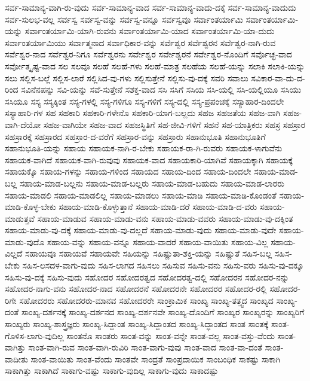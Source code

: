 {ಸರ್ವ-ಸಾಮಾನ್ಯ-ವಾಗಿ-ರು-ವುದು
ಸರ್ವ-ಸಾಮಾನ್ಯ-ವಾದ
ಸರ್ವ-ಸಾಮಾನ್ಯ-ವಾದು-ದಕ್ಕೆ
ಸರ್ವ-ಸಾಮಾನ್ಯ-ವಾದುದು
ಸರ್ವ-ಸುಲಭ-ವಲ್ಲ
ಸರ್ವಸ್ವ
ಸರ್ವಸ್ವ-ವನ್ನು
ಸರ್ವಸ್ವ-ವನ್ನೂ
ಸರ್ವಸ್ವವೂ
ಸರ್ವಾಂತರ್ಯಾಮಿ
ಸರ್ವಾಂತರ್ಯಾಮಿ-ಯನ್ನು
ಸರ್ವಾಂತರ್ಯಾಮಿ-ಯಾಗಿ-ರುವನು
ಸರ್ವಾಂತರ್ಯಾಮಿ-ಯಾದ
ಸರ್ವಾಂತರ್ಯಾಮಿ-ಯಾ-ದುದು
ಸರ್ವಾಂತರ್ಯಾಮಿಯು
ಸರ್ವಾತ್ಮನಾದ
ಸರ್ವಾಧಿಕಾರ-ವನ್ನು
ಸರ್ವೆಶ್ವರ
ಸರ್ವೆಶ್ವರನ
ಸರ್ವೆಶ್ವರ-ನಾಗಿ-ರುವ
ಸರ್ವೆಶ್ವರ-ನಾದ
ಸರ್ವೆಶ್ವರ-ನಿಗೂ
ಸರ್ವೆಶ್ವರನು
ಸರ್ವೇಶ್ವರ
ಸರ್ವೇಶ್ವರನೆ
ಸರ್ವೇಶ್ವರ-ನೊಂದಿಗೆ
ಸರ್ವೊಚ್ಛ-ವಾದ
ಸರ್ವೋತ್ಕೃಷ್ಟ-ವಾದ
ಸಲ
ಸಲವೂ
ಸಲಹೆ
ಸಲಹೆ-ಗಳು
ಸಲಹೆ-ಮಾತ್ರ
ಸಲಹೆಯ
ಸಲಹೆ-ಯನ್ನು
ಸಲಾಕಿ
ಸಲಾಕಿ-ಯನ್ನು
ಸಲು
ಸಲ್ಲಿಸ-ಬಲ್ಲೆ
ಸಲ್ಲಿಸ-ಲಾರೆ
ಸಲ್ಲಿಸಿದ-ವು-ಗಳು
ಸಲ್ಲಿಸುತ್ತೇನೆ
ಸಲ್ಲಿಸು-ವು-ದಕ್ಕೆ
ಸವರಿ
ಸವಾಲು
ಸವಿಕಾರ-ವಾ-ದು-ದ-ರಿಂದ
ಸವಿನೆನಪನ್ನು
ಸವಿ-ಯನ್ನು
ಸವೆ-ಸುತ್ತೇನೆ
ಸಶಕ್ತ-ವಾದ
ಸಸಿ
ಸಸಿಗೆ
ಸಸಿಯ
ಸಸಿ-ಯಲ್ಲಿ
ಸಸಿ-ಯಲ್ಲಿಯೂ
ಸಸಿಯು
ಸಸಿಯೂ
ಸಸ್ಯ
ಸಸ್ಯಕ್ಕಿಂತ
ಸಸ್ಯ-ಗಳಲ್ಲಿ
ಸಸ್ಯ-ಗಳಿಗೂ
ಸಸ್ಯ-ಗಳಿಗೆ
ಸಸ್ಯ-ದಲ್ಲಿ
ಸಸ್ಯ-ಪ್ರಪಂಚಕ್ಕೆ
ಸಸ್ಯಾಹಾರ-ದಿಂದಲೇ
ಸಸ್ಯಾಹಾರಿ-ಗಳ
ಸಹ
ಸಹಕಾರಿ
ಸಹಕಾರಿ-ಗಳೇನೊ
ಸಹಕಾರಿ-ಯಾಗ-ಬಲ್ಲದು
ಸಹಜ
ಸಹಜತೆಯ
ಸಹಜ-ವಾಗಿ
ಸಹಜ-ವಾಗಿ-ದೆಯೋ
ಸಹಜ-ವಾಗಿಯೇ
ಸಹಜ-ವಾದ
ಸಹಜಸ್ಥಿತಿಗೆ
ಸಹ-ಜೀವಿ-ಗಳಿಗೆ
ಸಹನೆ
ಸಹ-ಯಾತ್ರಿಕರು
ಸಹಸ್ರ
ಸಹಸ್ರಾರ
ಸಹಸ್ರಾರಕ್ಕೆ
ಸಹಸ್ರಾರದ
ಸಹಸ್ರಾರ-ದ-ವರೆಗೆ
ಸಹಸ್ರಾರ-ವನ್ನು
ಸಹಸ್ರಾರು
ಸಹಾನುಭೂತಿ
ಸಹಾನುಭೂತಿಗೆ
ಸಹಾನುಭೂತಿ-ಯನ್ನು
ಸಹಾಯ
ಸಹಾಯಕ-ನಾಗಿ-ರ-ಬೇಕು
ಸಹಾಯಕ-ರಾ-ಗಿ-ರುವರು
ಸಹಾಯಕ-ಳಾಗುವೆನು
ಸಹಾಯಕ-ವಾಗಿದೆ
ಸಹಾಯಕ-ವಾಗಿ-ರುವುವು
ಸಹಾಯಕ-ವಾದ
ಸಹಾಯಕಾರಿ-ಯಾಗಿವೆ
ಸಹಾಯಕ್ಕಾಗಿ
ಸಹಾಯಕ್ಕೆ
ಸಹಾಯಕ್ಕೊ
ಸಹಾಯ-ಗಳನ್ನು
ಸಹಾಯ-ಗಳಿಂದ
ಸಹಾಯದ
ಸಹಾಯ-ದಿಂದ
ಸಹಾಯ-ದಿಂದಲೇ
ಸಹಾಯ-ಮಾಡ-ಬಲ್ಲ
ಸಹಾಯ-ಮಾಡ-ಬಲ್ಲನು
ಸಹಾಯ-ಮಾಡ-ಬಲ್ಲರು
ಸಹಾಯ-ಮಾಡ-ಬಹುದು
ಸಹಾಯ-ಮಾಡ-ಲಾರರು
ಸಹಾಯ-ಮಾಡಲಿ
ಸಹಾಯ-ಮಾಡಲಿಲ್ಲ
ಸಹಾಯ-ಮಾಡಲು
ಸಹಾಯ-ಮಾಡಿ
ಸಹಾಯ-ಮಾಡಿ-ಕೊಂಡಂತೆ
ಸಹಾಯ-ಮಾಡಿ-ಕೊಳ್ಳ-ಬೇಕು
ಸಹಾಯ-ಮಾಡಿ-ಕೊಳ್ಳುತ್ತಾನೆ
ಸಹಾಯ-ಮಾಡಿ-ದರೆ
ಸಹಾಯ-ಮಾಡಿ-ದ-ವರು
ಸಹಾಯ-ಮಾಡುತ್ತವೆ
ಸಹಾಯ-ಮಾಡುವ
ಸಹಾಯ-ಮಾಡು-ವನು
ಸಹಾಯ-ಮಾಡು-ವವರು
ಸಹಾಯ-ಮಾಡು-ವು-ದಕ್ಕಿಂತ
ಸಹಾಯ-ಮಾಡು-ವು-ದಕ್ಕೆ
ಸಹಾಯ-ಮಾಡು-ವು-ದಲ್ಲದೆ
ಸಹಾಯ-ಮಾಡು-ವುದು
ಸಹಾಯ-ಮಾಡು-ವುದೇ
ಸಹಾಯ-ಮಾಡು-ವುದೊ
ಸಹಾಯ-ವನ್ನು
ಸಹಾಯ-ವನ್ನೂ
ಸಹಾಯ-ವಾದರೆ
ಸಹಾಯ-ವಾಯಿತು
ಸಹಾಯ-ವಿಲ್ಲ
ಸಹಾಯ-ವಿಲ್ಲದೆ
ಸಹಾಯವೂ
ಸಹಾಯವೆ
ಸಹಾಯವೇ
ಸಹಿಯನ್ನು
ಸಹಿಷ್ಣುತಾ-ಶಕ್ತಿ-ಯನ್ನು
ಸಹಿಷ್ಣುತೆ
ಸಹಿಸ-ಬಲ್ಲ
ಸಹಿಸ-ಬೇಕು
ಸಹಿಸ-ಲಸದಳ-ವಾಗು-ವುದು
ಸಹಿಸ-ಲಾಗದ
ಸಹಿಸಲು
ಸಹಿಸುವ
ಸಹಿಸು-ವನು
ಸಹಿಸು-ವರು
ಸಹಿಸು-ವು-ದಕ್ಕೂ
ಸಹಿಸು-ವು-ದಕ್ಕೆ
ಸಹಿಸು-ವುದು
ಸಹೋದರ
ಸಹೋದರತ್ವದ
ಸಹೋದರತ್ವ-ದಲ್ಲಿ
ಸಹೋದರನ
ಸಹೋದರ-ನನ್ನು
ಸಹೋದರ-ನಾಗು-ವನು
ಸಹೋದರ-ನಾದ
ಸಹೋದರನೆ
ಸಹೋದರನೇ
ಸಹೋದರರ
ಸಹೋದರ-ರಲ್ಲಿ
ಸಹೋದರ-ರಿಗೇ
ಸಹೋದರರು
ಸಹೋದರರು-ಮಾನವ
ಸಹೋದರರೇ
ಸಾಂಕ್ರಾಮಿಕ
ಸಾಂಖ್ಯ
ಸಾಂಖ್ಯ-ತತ್ತ್ವದ
ಸಾಂಖ್ಯದ
ಸಾಂಖ್ಯ-ದಂತೆ
ಸಾಂಖ್ಯ-ದರ್ಶನಕ್ಕೆ
ಸಾಂಖ್ಯ-ದರ್ಶನದ
ಸಾಂಖ್ಯ-ದರ್ಶನವೇ
ಸಾಂಖ್ಯ-ದೊಂದಿಗೆ
ಸಾಂಖ್ಯರ
ಸಾಂಖ್ಯರನ್ನು
ಸಾಂಖ್ಯರಿಗೆ
ಸಾಂಖ್ಯರು
ಸಾಂಖ್ಯ-ಶಾಸ್ತ್ರಜ್ಞರು
ಸಾಂಖ್ಯ-ಸಿದ್ದಾಂತ
ಸಾಂಖ್ಯ-ಸಿದ್ದಾಂತದ
ಸಾಂಖ್ಯ-ಸಿದ್ಧಾಂತದ
ಸಾಂತ
ಸಾಂತಕ್ಕೆ
ಸಾಂತ-ಗೊಳಿಸ-ಲಾಗು-ವುದಿಲ್ಲ
ಸಾಂತನೊ
ಸಾಂತರು
ಸಾಂತ-ವನ್ನು
ಸಾಂತ-ವನ್ನೇ
ಸಾಂತ-ವಲ್ಲ
ಸಾಂತ-ವಸ್ತು-ವೆಂದು
ಸಾಂತ-ವಾಗಿತ್ತು
ಸಾಂತ-ವಾಗಿ-ರುವ
ಸಾಂತ-ವಾಗಿ-ರುವಿರಿ
ಸಾಂತ-ವಾಗು-ವುವು
ಸಾಂತ-ವಾದ
ಸಾಂತ-ವಾ-ದಂತೆ
ಸಾಂತ-ವಾದೀತು
ಸಾಂತ-ವಾಯಿತು
ಸಾಂತ-ವೆಂದು
ಸಾಂತವೇ
ಸಾಂದ್ರತೆ
ಸಾಂಪ್ರದಾಯಿಕ
ಸಾಂಬಂಧಿಕ
ಸಾಕಷ್ಟು
ಸಾಕಾಗಿ
ಸಾಕಾಗಿತ್ತು
ಸಾಕಾಗಿದೆ
ಸಾಕಾಗು-ವಷ್ಟು
ಸಾಕಾಗು-ವುದಿಲ್ಲ
ಸಾಕಾಗು-ವುದು
ಸಾಕಾದಷ್ಟು
}
